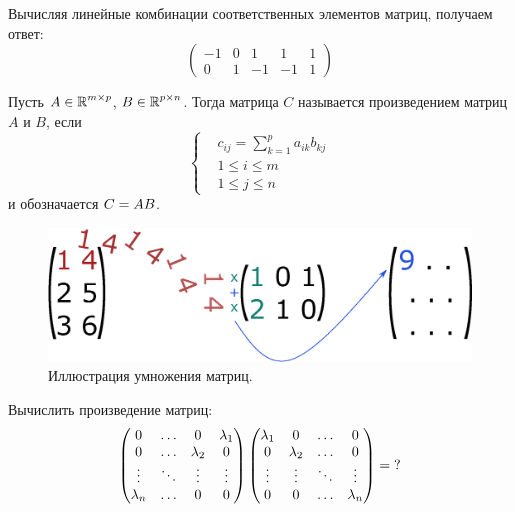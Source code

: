 \documentclass[a4paper,12pt]{article}
\begin{document}
  \begin{solution}
    Вычисляя линейные комбинации соответственных элементов матриц, получаем ответ:
    \[
      \begin{pmatrix}
        -1 & 0 & 1 & 1 & 1\\
        0 & 1 & -1 & -1 & 1
      \end{pmatrix}
    \]
  \end{solution}
  
  
  \begin{definition}
    Пусть $A \hm\in \RR^{m \times p}$, $B \hm\in \RR^{p \times n}$.
    Тогда матрица $C$ называется произведением матриц $A$ и $B$, если
    \[
      \left\{
        \begin{aligned}
          &c_{ij} = \sum_{k = 1}^p a_{ik} b_{kj}\\
          &1 \leq i \leq m\\
          &1 \leq j \leq n
        \end{aligned}
      \right.
    \]
    и обозначается $C \hm= AB$.
  \end{definition}

  \begin{figure}[h]
    \centering
    
    \includegraphics[width=0.5\columnwidth]{matrix-multiplication}
    
    \caption{Иллюстрация умножения матриц.}
    \label{fig:matrix-multiplication}
  \end{figure}
  
  
  \begin{problem}[15.5(12)]
    Вычислить произведение матриц:
    \[
      \begin{pmatrix}
        0         & \ldots & 0         & \lambda_1\\
        0         & \ldots & \lambda_2 & 0\\
        \vdots    & \ddots & \vdots    & \vdots\\
        \lambda_n & \ldots & 0         & 0
      \end{pmatrix}
      \begin{pmatrix}
        \lambda_1 & 0         & \ldots & 0\\
        0         & \lambda_2 & \ldots & 0\\
        \vdots    & \vdots    & \ddots & \vdots\\
        0         & 0         & \ldots & \lambda_n
      \end{pmatrix} = \operatorname{?}
    \]
  \end{problem}
  
\end{document}
